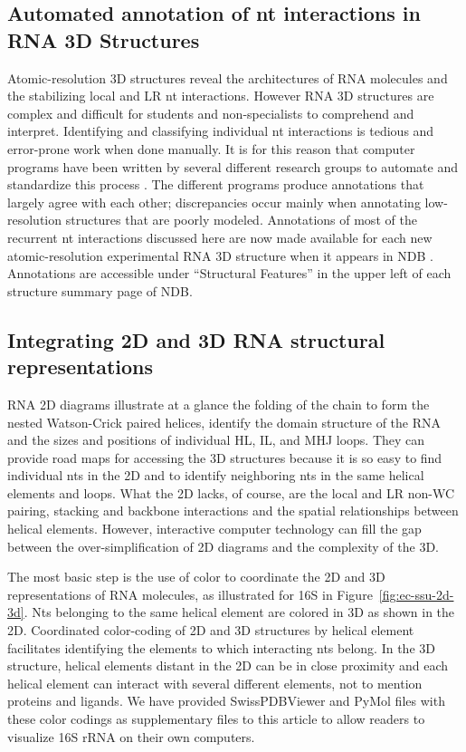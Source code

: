 \subsection{Automated annotation of nt interactions in RNA 3D Structures}

Atomic-resolution 3D structures reveal the architectures of RNA molecules and
the stabilizing local and LR nt interactions. However RNA 3D structures are
complex and difficult for students and non-specialists to comprehend and
interpret. Identifying and classifying individual nt interactions is tedious and
error-prone work when done manually. It is for this reason that computer
programs have been written by several different research groups to automate and
standardize this process \cite{Petrov2011a, Sarver2008a, Yang2003a,
Gendron2001b, Parisien2008a}. The different programs produce annotations that
largely agree with each other; discrepancies occur mainly when annotating
low-resolution structures that are poorly modeled. Annotations of most of the
recurrent nt interactions discussed here are now made available for each new
atomic-resolution experimental RNA 3D structure when it appears in NDB
\cite{Petrov2013}. Annotations are accessible under ``Structural Features'' in
the upper left of each structure summary page of NDB. 

\subsection{Integrating 2D and 3D RNA structural representations}

RNA 2D diagrams illustrate at a glance the folding of the chain to form the
nested Watson-Crick paired helices, identify the domain structure of the RNA and
the sizes and positions of individual HL, IL, and MHJ loops. They can provide
road maps for accessing the 3D structures because it is so easy to find
individual nts in the 2D and to identify neighboring nts in the same helical
elements and loops. What the 2D lacks, of course, are the local and LR non-WC
pairing, stacking and backbone interactions and the spatial relationships
between helical elements. However, interactive computer technology can fill the
gap between the over-simplification of 2D diagrams and the complexity of the 3D. 

The most basic step is the use of color to coordinate the 2D and 3D
representations of RNA molecules, as illustrated for 16S in
Figure~\ref{fig:ec-ssu-2d-3d}. Nts belonging to the same helical element are
colored in 3D as shown in the 2D. Coordinated color-coding of 2D and 3D
structures by helical element facilitates identifying the elements to which
interacting nts belong. In the 3D structure, helical elements distant in the 2D
can be in close proximity and each helical element can interact with several
different elements, not to mention proteins and ligands.  We have provided
SwissPDBViewer and PyMol files with these color codings as supplementary files
to this article to allow readers to visualize \EC{} 16S rRNA on their own
computers. 

